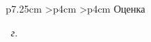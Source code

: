 \begin{titlepage}
\begin{table}[h!]
		\vspace{\baselineskip}
		
		\begin{signstabular}[0.55]{p{7.25cm} >{\centering\arraybackslash}p{4cm} >{\centering\arraybackslash}p{4cm}}
			Оценка~~\uline{\hfill}
		\end{signstabular} 
		
	\end{table}
	
	\vfill
	
	\begin{center}
		\normalsize \textit{\the\year~г.}
	\end{center}
\end{titlepage}